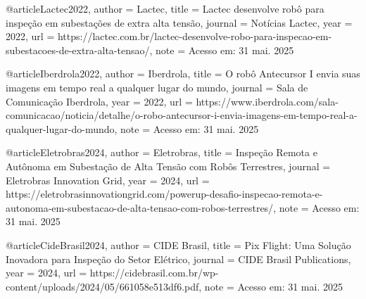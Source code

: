 @article{Lactec2022,
  author = {Lactec},
  title = {Lactec desenvolve robô para inspeção em subestações de extra alta tensão},
  journal = {Notícias Lactec},
  year = {2022},
  url = {https://lactec.com.br/lactec-desenvolve-robo-para-inspecao-em-subestacoes-de-extra-alta-tensao/},
  note = {Acesso em: 31 mai. 2025}
}

@article{Iberdrola2022,
  author = {Iberdrola},
  title = {O robô Antecursor I envia suas imagens em tempo real a qualquer lugar do mundo},
  journal = {Sala de Comunicação Iberdrola},
  year = {2022},
  url = {https://www.iberdrola.com/sala-comunicacao/noticia/detalhe/o-robo-antecursor-i-envia-imagens-em-tempo-real-a-qualquer-lugar-do-mundo},
  note = {Acesso em: 31 mai. 2025}
}

@article{Eletrobras2024,
  author = {Eletrobras},
  title = {Inspeção Remota e Autônoma em Subestação de Alta Tensão com Robôs Terrestres},
  journal = {Eletrobras Innovation Grid},
  year = {2024},
  url = {https://eletrobrasinnovationgrid.com/powerup-desafio-inspecao-remota-e-autonoma-em-subestacao-de-alta-tensao-com-robos-terrestres/},
  note = {Acesso em: 31 mai. 2025}
}

@article{CideBrasil2024,
  author = {CIDE Brasil},
  title = {Pix Flight: Uma Solução Inovadora para Inspeção do Setor Elétrico},
  journal = {CIDE Brasil Publications},
  year = {2024},
  url = {https://cidebrasil.com.br/wp-content/uploads/2024/05/661058e513df6.pdf},
  note = {Acesso em: 31 mai. 2025}
}
